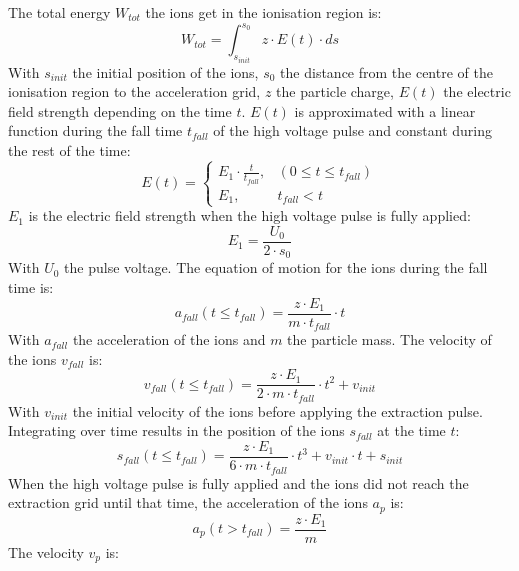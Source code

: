 	
	The total energy $W_{tot}$ the ions get in the ionisation region is:
	\begin{equation}
		W_{tot} = \int_{s_{init}}^{s_0} z\cdot E(t)\cdot ds
	\end{equation}
	With $s_{init}$ the initial position of the ions, $s_0$ the distance from the centre of the ionisation region to the acceleration grid, $z$ the particle charge, $E(t)$ the electric field strength depending on the time $t$. $E(t)$ is approximated with a linear function during the fall time $t_{fall}$ of the high voltage pulse and constant during the rest of the time:
	\begin{equation}
		E(t) =
		\begin{cases}
			E_1\cdot\frac{t}{t_{fall}},& (0\leq t\leq t_{fall})\\
			E_1,& t_{fall} < t
		\end{cases}
	\label{eq:PulseEt}
	\end{equation}
	$E_1$ is the electric field strength when the high voltage pulse is fully applied:
	\begin{equation}
		E_1 = \frac{U_0}{2\cdot s_0}
	\end{equation}
	With $U_0$ the pulse voltage. The equation of motion for the ions during the fall time is:
	\begin{equation}
		a_{fall}(t\leq t_{fall}) = \frac{z\cdot E_1}{m\cdot t_{fall}}\cdot t
		\label{eq:afall}
	\end{equation}
	With $a_{fall}$ the acceleration of the ions and $m$ the particle mass. The velocity of the ions $v_{fall}$ is:
	\begin{equation}
		v_{fall}(t\leq t_{fall}) = \frac{z\cdot E_1}{2\cdot m\cdot t_{fall}}\cdot t^2 + v_{init}\label{eq:vfall}
	\end{equation}
	With $v_{init}$ the initial velocity of the ions before applying the extraction pulse. Integrating over time results in the position of the ions $s_{fall}$ at the time $t$:
	\begin{equation}
		s_{fall}(t\leq t_{fall}) = \frac{z\cdot E_1}{6\cdot m\cdot t_{fall}}\cdot t^3 + v_{init}\cdot t + s_{init}
		\label{eq:sfall}
	\end{equation}
	When the high voltage pulse is fully applied and the ions did not reach the extraction grid until that time, the acceleration of the ions $a_{p}$ is:
	\begin{equation}
		a_{p}(t > t_{fall}) = \frac{z\cdot E_1}{m}
		\label{eq:ap}
	\end{equation}
	The velocity $v_{p}$ is:
